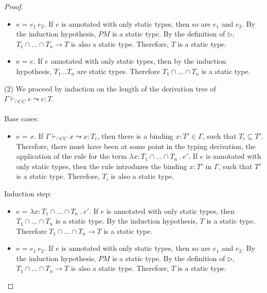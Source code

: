\documentclass[a4paper]{article}
\begin{document}
\begin{proof}
\begin{itemize}
    \item e = $e_1\ e_2$.
    If $e$ is annotated with only static types, then so are $e_1$ and $e_2$.
    By the induction hypothesis, $PM$ is a static type.
    By the definition of $\rhd$, $T_1 \cap \ldots \cap T_n \rightarrow T$ is also a static type.
    Therefore, $T$ is a static type.
    \item e = $e$.
    If $e$ annotated with only static types, then by the induction hypothesis, $T_1 \ldots T_n$ are static types.
    Therefore $T_1 \cap \ldots \cap T_n$ is a static type.
\end{itemize}
(2) We proceed by induction on the length of the derivation tree of $\Gamma \vdash_{\cap CC} e \leadsto e : T$.\\\\
Base cases:
\begin{itemize}
    \item e = $x$.
    If $\Gamma \vdash_{\cap CC} x \leadsto x : T_i$, then there is a binding $x : T' \in \Gamma$, such that $T_i \subseteq T'$.
    Therefore, there must have been at some point in the typing derivation, the application of the rule for the term $\lambda x : T_1 \cap \ldots \cap T_n\ .\ e'$.
    If $e$ is annotated with only static types, then the rule introduzes the binding $x : T'$ in $\Gamma$, such that $T'$ is a static type.
    Therefore, $T_i$ is also a static type.
\end{itemize}
Induction step:
\begin{itemize}
    \item e = $\lambda x : T_1 \cap \ldots \cap T_n\ .\ e'$.
    If $e$ is annotated with only static types, then $T_1 \cap \ldots \cap T_n$ is a static type.
    By the induction hypothesis, $T$ is a static type.
    Therefore $T_1 \cap \ldots \cap T_n \rightarrow T$ is a static type.
    \item e = $e_1\ e_2$.
    If $e$ is annotated with only static types, then so are $e_1$ and $e_2$.
    By the induction hypothesis, $PM$ is a static type.
    By the definition of $\rhd$, $T_1 \cap \ldots \cap T_n \rightarrow T$ is also a static type.
    Therefore, $T$ is a static type.
\end{itemize}
\end{proof}
\end{document}
